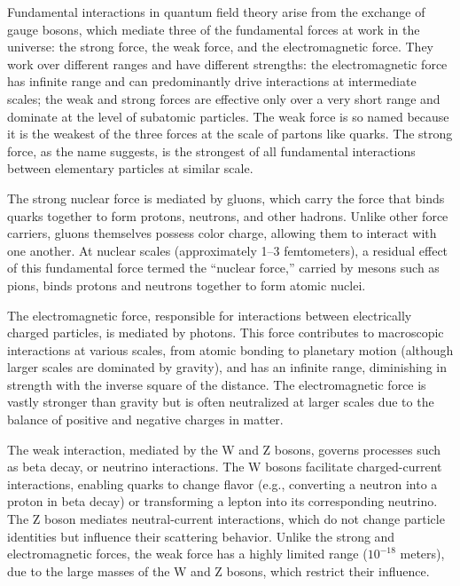 Fundamental interactions in quantum field theory arise from the exchange of gauge bosons, which mediate three of the fundamental forces at work in the universe: the strong force, the weak force, and the electromagnetic force. They work over different ranges and have different strengths: the electromagnetic force has infinite range and can predominantly drive interactions at intermediate scales; the weak and strong forces are effective only over a very short range and dominate at the level of subatomic particles. The weak force is so named because it is the weakest of the three forces at the scale of partons like quarks. The strong force, as the name suggests, is the strongest of all fundamental interactions between elementary particles at similar scale. 

The strong nuclear force is mediated by gluons, which carry the force that binds quarks together to form protons, neutrons, and other hadrons. Unlike other force carriers, gluons themselves possess color charge, allowing them to interact with one another. At nuclear scales (approximately 1–3 femtometers), a residual effect of this fundamental force termed the ``nuclear force,'' carried by mesons such as pions, binds protons and neutrons together to form atomic nuclei. 

The electromagnetic force, responsible for interactions between electrically charged particles, is mediated by photons. This force contributes to macroscopic interactions at various scales, from atomic bonding to planetary motion (although larger scales are dominated by gravity), and has an infinite range, diminishing in strength with the inverse square of the distance. The electromagnetic force is vastly stronger than gravity but is often neutralized at larger scales due to the balance of positive and negative charges in matter.  

The weak interaction, mediated by the W and Z bosons, governs processes such as beta decay, or neutrino interactions. %
The W bosons facilitate charged-current interactions, enabling quarks to change flavor (e.g., converting a neutron into a proton in beta decay) or transforming a lepton into its corresponding neutrino. The Z boson mediates neutral-current interactions, which do not change particle identities but influence their scattering behavior. Unlike the strong and electromagnetic forces, the weak force has a highly limited range ($10^{-18}$ meters), due to the large masses of the W and Z bosons, which restrict their influence.  

